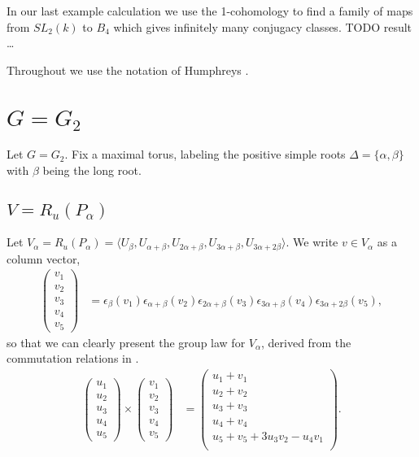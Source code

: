 	In our last example calculation we use the 1-cohomology to find a family of maps from $SL_2(k)$ to $B_4$ which gives infinitely many conjugacy classes. TODO result \ldots

	Throughout we use the notation of Humphreys \cite[Chapter XI]{humphreys1975linear}.

	\section{$G = G_2$}
	\label{g2}

	Let $G=G_2$. Fix a maximal torus, labeling the positive simple roots $\Delta=\{\alpha, \beta\}$ with $\beta$ being the long root. 

	\subsection{$V = R_u(P_\alpha)$}
	\label{g2:alpha}
	Let $V_\alpha = R_u(P_\alpha) = \langle U_\beta, U_{\alpha+\beta}, U_{2\alpha+\beta}, U_{3\alpha+\beta}, U_{3\alpha+2\beta}\rangle$.
	We write $v \in V_\alpha$ as a column vector,
	\begin{align*}
	\left(\begin{matrix}
			v_1\\
			v_2\\
			v_3\\
			v_4\\
			v_5
			\end{matrix}\right) &=
\epsilon_{\beta}(v_1)
\epsilon_{\alpha+\beta}(v_2)
\epsilon_{2\alpha+\beta}(v_3)
\epsilon_{3\alpha+\beta}(v_4)
	\epsilon_{3\alpha+2\beta}(v_5),
	\end{align*}
	so that we can clearly present the group law for $V_\alpha$, derived from the commutation relations in \cite[\S 33.5]{humphreys1975linear}.
	\begin{align*}
	\left(\begin{matrix}
			u_1\\
			u_2\\
			u_3\\
			u_4\\
			u_5
			\end{matrix}\right)\times
	\left(\begin{matrix}
			v_1\\
			v_2\\
			v_3\\
			v_4\\
			v_5
			\end{matrix}\right)
	&= \left(\begin{matrix}
			u_1 + v_1\\
			u_2 + v_2\\
			u_3 + v_3\\
			u_4 + v_4\\
			u_5 + v_5 + 3u_3v_2 - u_4v_1\\
			\end{matrix}\right).
	\end{align*}
